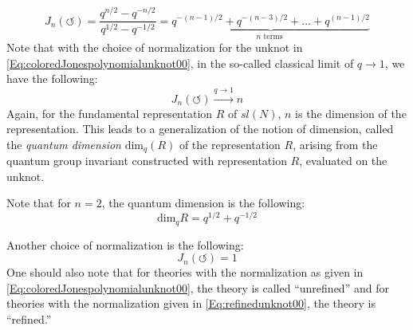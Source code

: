 \documentclass[a4paper,titlepage,twoside]{book}
\begin{document}
\begin{equation}
  J_n{( \circlearrowleft )} = \frac{ q^{n/2} - q^{-n/2}}{ q^{1/2} - q^{-1/2} } = \underbrace{ q^{ -(n-1)/2 } + q^{ - (n-3)/2 } + \dots + q^{ (n-1)/2 } }_{ n \text{ terms } }  \label{Eq:coloredJonespolynomialunknot00}
\end{equation}
Note that with the choice of normalization for the unknot in \eqref{Eq:coloredJonespolynomialunknot00}, in the so-called classical limit of $q\to 1$, we have the following:
\begin{equation}
  J_n{ (\circlearrowleft)} \xrightarrow{ q\to 1} n
\end{equation}
Again, for the fundamental representation $R$ of $sl{(N)}$, $n$ is the dimension of the representation.  This leads to a generalization of the notion of dimension, called the \emph{quantum dimension} $\text{dim}_q{ (R)}$ of the representation $R$, arising from the quantum group invariant constructed with representation $R$, evaluated on the unknot.  

Note that for $n=2$, the quantum dimension is the following:
\begin{equation}
\text{dim}_q{ R} = q^{1/2} + q^{-1/2} \label{eq:unknotqdim}
\end{equation}

Another choice of normalization is the following:
\begin{equation}
  J_n{ (\circlearrowleft)} = 1 \label{Eq:refinedunknot00}
\end{equation}
One should also note that for theories with the normalization as given in \eqref{Eq:coloredJonespolynomialunknot00}, the theory is called ``unrefined'' and for theories with the normalization given in \eqref{Eq:refinedunknot00}, the theory is ``refined.''  



\end{document}

